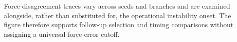 Force-disagreement traces vary across seeds and branches and are examined alongside, rather than substituted for, the operational instability onset. The figure therefore supports follow-up selection and timing comparisons without assigning a universal force-error cutoff.

